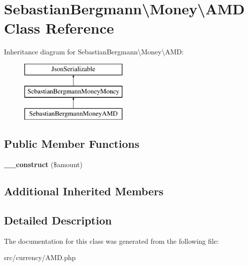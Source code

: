\hypertarget{classSebastianBergmann_1_1Money_1_1AMD}{}\section{Sebastian\+Bergmann\textbackslash{}Money\textbackslash{}A\+M\+D Class Reference}
\label{classSebastianBergmann_1_1Money_1_1AMD}
Inheritance diagram for Sebastian\+Bergmann\textbackslash{}Money\textbackslash{}A\+M\+D\+:\begin{figure}[H]
\begin{center}
\leavevmode
\includegraphics[height=3.000000cm]{classSebastianBergmann_1_1Money_1_1AMD}
\end{center}
\end{figure}
\subsection*{Public Member Functions}
\begin{DoxyCompactItemize}
\item 
\hypertarget{classSebastianBergmann_1_1Money_1_1AMD_a64d111880fbc8218be40dd81f3976a27}{}{\bfseries \+\_\+\+\_\+construct} (\$amount)\label{classSebastianBergmann_1_1Money_1_1AMD_a64d111880fbc8218be40dd81f3976a27}

\end{DoxyCompactItemize}
\subsection*{Additional Inherited Members}


\subsection{Detailed Description}


The documentation for this class was generated from the following file\+:\begin{DoxyCompactItemize}
\item 
src/currency/A\+M\+D.\+php\end{DoxyCompactItemize}
